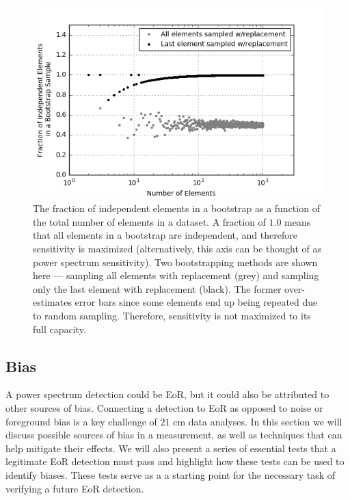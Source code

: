 \documentclass[preprint2,numberedappendix,tighten]{aastex6}  %
\begin{document}
\begin{figure}
	\centering
	\includegraphics[trim={0.3cm 0.3cm 0.3cm 0.3cm},width=\columnwidth]{plots/toy_error2.png}
	\caption{The fraction of independent elements in a bootstrap as a function of the total number of elements in a dataset. A fraction of $1.0$ means that all elements in a bootstrap are independent, and therefore sensitivity is maximized (alternatively, this axis can be thought of as power spectrum sensitivity). Two bootstrapping methods are shown here --- sampling all elements with replacement (grey) and sampling only the last element with replacement (black). The former over-estimates error bars since some elements end up being repeated due to random sampling. Therefore, sensitivity is not maximized to its full capacity.}
	\label{fig:toy_error2}
\end{figure}

\subsection{Bias}
\label{sec:BiasOverview}

A power spectrum detection could be EoR, but it could also be attributed to other sources of bias. Connecting a detection to EoR as opposed to noise or foreground bias is a key challenge of $21$ cm data analyses. In this section we will discuss possible sources of bias in a measurement, as well as techniques that can help mitigate their effects. We will also present a series of essential tests that a legitimate EoR detection must pass and highlight how these tests can be used to identify biases. These tests serve as a a starting point for the necessary task of verifying a future EoR detection.
\end{document}
